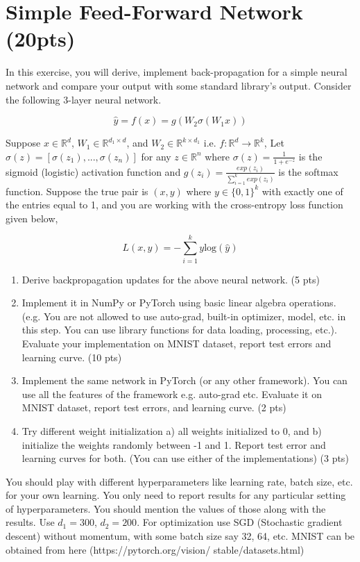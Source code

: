 \documentclass[a4paper]{article}
\theoremstyle{definition}
\begin{document}
\section{Simple Feed-Forward Network (20pts)}
In this exercise, you will derive, implement back-propagation for a simple neural network and compare your output with some standard library’s output. Consider the following 3-layer neural network.

\[
	\hat{y} = f(x) = g(W_2\sigma(W_1x))
\]

Suppose $x \in \mathbb{R}^d$, $W_1 \in \mathbb{R}^{d_1 \times d}$, and $W_2 \in \mathbb{R}^{k \times d_1}$ i.e. $f: \mathbb{R}^d \rightarrow \mathbb{R}^k$, Let $\sigma(z) = [\sigma(z_1), ..., \sigma(z_n)]$ for any $z \in \mathbb{R}^n$ where $\sigma(z) = \frac{1}{1 + e^{-z}}$ is the sigmoid (logistic) activation function and $g(z_i) = \frac{exp(z_i)}{\sum_{i=1}^k exp(z_i)}$ is the softmax function. Suppose the true pair is $(x, y)$ where $y \in \{0, 1\}^k$ with exactly one of the entries equal to 1, and you are working with the cross-entropy loss function given below,

\[
	L(x, y) = -\sum_{i=1}^k y \text{log}(\hat{y})
\]

\begin{enumerate}
	\item Derive backpropagation updates for the above neural network. (5 pts)
	\item Implement it in NumPy or PyTorch using basic linear algebra operations. (e.g. You are not allowed to use auto-grad, built-in optimizer, model, etc. in this step. You can use library functions for data loading, processing, etc.). Evaluate your implementation on MNIST dataset, report test errors and learning curve. (10 pts)
	\item Implement the same network in PyTorch (or any other framework). You can use all the features of the framework e.g. auto-grad etc. Evaluate it on MNIST dataset, report test errors, and learning curve. (2 pts)
	\item Try different weight initialization a) all weights initialized to 0, and b) initialize the weights randomly between -1 and 1. Report test error and learning curves for both. (You can use either of the implementations) (3 pts)
\end{enumerate}

You should play with different hyperparameters like learning rate, batch size, etc. for your own learning. You only need to report results for any particular setting of hyperparameters. You should mention the values of those along with the results. Use $d_1 = 300$, $d_2 = 200$. For optimization use SGD (Stochastic gradient descent) without momentum, with some batch size say 32, 64, etc. MNIST can be obtained from here (https://pytorch.org/vision/ stable/datasets.html)


\end{document}
